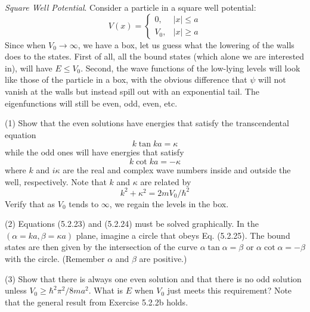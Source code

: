 \documentclass[../principles-of-quantum-mechanics.tex]{subfiles}
\begin{document}
\begin{questions}
	\question \textit{Square Well Potential}. Consider a particle in a square well potential:
	$$V(x) = \begin{cases}
		0, &|x| \leq a \\
		V_0, &|x| \geq a
	\end{cases}$$
	Since when $V_0\to\infty$, we have a box, let us guess what the lowering of the walls does to the states. First of all, all the bound states (which alone we are interested in), will have $E \leq V_0$. Second, the wave functions of the low-lying levels will look like those of the particle in a box, with the obvious difference that $\psi$ will not vanish at the walls but instead spill out with an exponential tail. The eigenfunctions will still be even, odd, even, etc.
	
	(1) Show that the even solutions have energies that satisfy the transcendental equation
	$$k\tan ka = \kappa$$
	while the odd ones will have energies that satisfy
	$$k \cot ka = -\kappa$$
	where $k$ and $i\kappa$ are the real and complex wave numbers inside and outside the well, respectively. Note that $k$ and $\kappa$ are related by
	$$k^2 + \kappa^2 = 2mV_0/\hbar^2$$
	Verify that as $V_0$ tends to $\infty$, we regain the levels in the box.
	
	(2) Equations (5.2.23) and (5.2.24) must be solved graphically. In the $(\alpha = ka, \beta = \kappa a)$ plane, imagine a circle that obeys Eq. (5.2.25). The bound states are then given by the intersection of the curve $\alpha \tan \alpha = \beta$ or $\alpha \cot \alpha = -\beta$ with the circle. (Remember $\alpha$ and $\beta$ are positive.)
	
	(3) Show that there is always one even solution and that there is no odd solution unless $V_0 \geq \hbar^2\pi^2 / 8ma^2$. What is $E$ when $V_0$ just meets this requirement? Note that the general result from Exercise 5.2.2b holds.
	

\end{questions}
\end{document}
